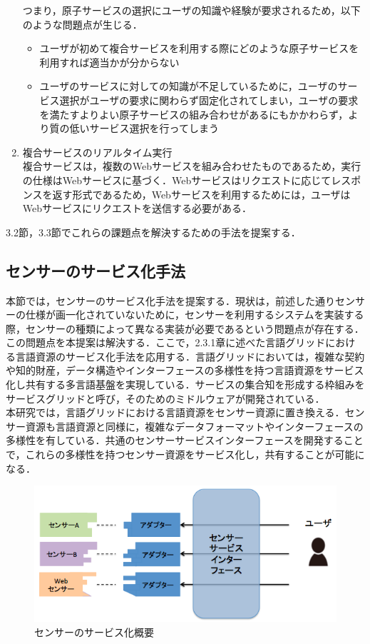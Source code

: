 \documentclass{kuisthesis}			%
\begin{document}
\begin{enumerate}
つまり，原子サービスの選択にユーザの知識や経験が要求されるため，以下のような問題点が生じる．
\begin{itemize}
\item ユーザが初めて複合サービスを利用する際にどのような原子サービスを利用すれば適当かが分からない
\item ユーザのサービスに対しての知識が不足しているために，ユーザのサービス選択がユーザの要求に関わらず固定化されてしまい，ユーザの要求を満たすよりよい原子サービスの組み合わせがあるにもかかわらず，より質の低いサービス選択を行ってしまう
\end{itemize}
\item 複合サービスのリアルタイム実行\\
複合サービスは，複数のWebサービスを組み合わせたものであるため，実行の仕様はWebサービスに基づく．Webサービスはリクエストに応じてレスポンスを返す形式であるため，Webサービスを利用するためには，ユーザはWebサービスにリクエストを送信する必要がある．
\end{enumerate}
3.2節，3.3節でこれらの課題点を解決するための手法を提案する．

\subsection{センサーのサービス化手法}
本節では，センサーのサービス化手法を提案する．現状は，前述した通りセンサーの仕様が画一化されていないために，センサーを利用するシステムを実装する際，センサーの種類によって異なる実装が必要であるという問題点が存在する．この問題点を本提案は解決する．ここで，2.3.1章に述べた言語グリッドにおける言語資源のサービス化手法を応用する．言語グリッドにおいては，複雑な契約や知的財産，データ構造やインターフェースの多様性を持つ言語資源をサービス化し共有する多言語基盤を実現している．サービスの集合知を形成する枠組みをサービスグリッドと呼び，そのためのミドルウェアが開発されている．\cite{Bus2014}\\
本研究では，言語グリッドにおける言語資源をセンサー資源に置き換える．センサー資源も言語資源と同様に，複雑なデータフォーマットやインターフェースの多様性を有している．共通のセンサーサービスインターフェースを開発することで，これらの多様性を持つセンサー資源をサービス化し，共有することが可能になる．


\begin{figure}
 \begin{center}
  \includegraphics[width=\linewidth]{pic/sensorservice.png}
  \caption{センサーのサービス化概要}
 \end{center}
 \label{sensorservice}
\end{figure}
\end{document}
